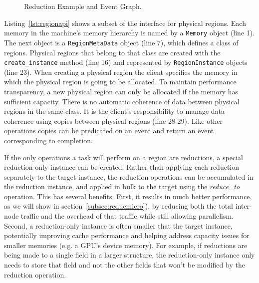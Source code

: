 \begin{figure}
{{
}
}
  \caption{Reduction Example and Event Graph.\label{fig:reducevents}}
  \vspace{-4mm}
\end{figure}

Listing~\ref{lst:regionapi} shows a subset of the interface for physical regions.  
Each memory in the machine's memory hierarchy is named by a {\tt Memory} object (line 1).
The next object is a {\tt RegionMetaData} object (line 7), which defines a class of
regions.  Physical regions that belong to that class are created with the {\tt create\_instance}
method (line 16) and represented by {\tt RegionInstance} objects (line 23).  When creating a physical
region the client specifies the memory in which the physical region is going
to be allocated.  To maintain performance transparency, a new physical region can only be allocated
if the memory has sufficient capacity.
There is no automatic coherence of data between physical regions in the
same class.  It is the client's responsibility to manage data coherence using copies
between physical regions (line 28-29).  Like other operations copies can be
predicated on an event and return an event corresponding to completion.

If the only operations a task will perform on a region are reductions, a special reduction-only
instance can be created.  Rather than applying each reduction separately to the target instance,
the reduction operations can be accumulated in the reduction instance, and applied in bulk to 
the target using the {\em reduce\_to} operation.  This has several benefits.  First, it results
in much better performance, as we will show in section~\ref{subsec:reducmicro}), by reducing both
the total inter-node traffic and the overhead of that traffic while still allowing parallelism.
Second, a reduction-only instance is often smaller that the target instance, potentially improving
cache performance and helping address capacity issues for smaller memories (e.g. a GPU's device
memory).  For example, if reductions are being made to a single field in a larger structure, the 
reduction-only instance only needs to store that field and not the other fields that won't be 
modified by the reduction operation.

